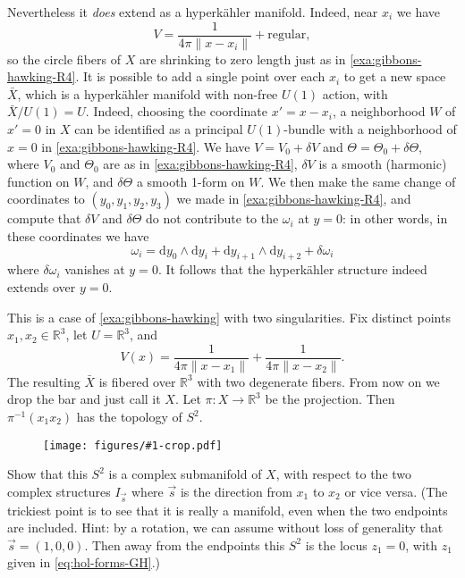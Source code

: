 \documentclass[12pt,letterpaper,reqno]{article}
\numberwithin{equation}{section}
\newcommand{\R}{\ensuremath{\mathbb R}}
\newcommand{\hk}{hyperk\"ahler\xspace}
\newcommand{\de}{\mathrm{d}}
\newcommand{\norm}[1]{\lVert#1\rVert}
\newcommand{\ti}[1]{\textit{#1}}
\newcommand{\insfig}[2]{\begin{figure}[htbp] \centering \texttt{[image: figures/\#1-crop.pdf]} \label{fig:#1} \end{figure}}
\begin{document}
\begin{example}
Nevertheless it \ti{does} extend as a \hk manifold.
Indeed, near $x_i$ we have
\begin{equation}
V = \frac{1}{4\pi\norm{x - x_i}} + \text{regular},
\end{equation}
so the circle fibers of $X$ are shrinking to zero
length just as in \autoref{exa:gibbons-hawking-R4}.
It is possible to add a single point over each $x_i$
to get a new space $\bar X$, which is a \hk manifold with non-free 
$U(1)$ action, with $\bar X / U(1) = U$.
Indeed, choosing the coordinate $x' = x - x_i$,
a neighborhood $W$ of $x' = 0$ in $X$ can be identified as a 
principal $U(1)$-bundle with a neighborhood of $x = 0$
in \autoref{exa:gibbons-hawking-R4}. We have
$V = V_0 + \delta V$ and $\Theta = \Theta_0 + \delta \Theta$,
where $V_0$ and $\Theta_0$ are as in \autoref{exa:gibbons-hawking-R4},
$\delta V$ is a smooth (harmonic) function on $W$, 
and $\delta \Theta$ a smooth 1-form on $W$.
We then make the same change of coordinates 
to $(y_0,y_1,y_2,y_3)$ we made in 
\autoref{exa:gibbons-hawking-R4}, and compute that $\delta V$
and $\delta \Theta$ do not contribute to the $\omega_i$ at
$y=0$: in other words, in these coordinates we have
\begin{equation} \label{eq:gibbons-hawking-near-singularity}
  \omega_i = \de y_0 \wedge \de y_i + \de y_{i+1} \wedge \de y_{i+2} + \delta \omega_i
\end{equation}
where $\delta \omega_i$ vanishes at $y = 0$. It follows
that the \hk structure indeed extends over $y = 0$.
\end{example}

\begin{example}
This is a case of \autoref{exa:gibbons-hawking}
with two singularities. Fix distinct points
$x_1, x_2 \in \R^3$, let $U = \R^3$, and 
\begin{equation}
  V(x) = \frac{1}{4\pi \norm{x - x_1}} + \frac{1}{4\pi \norm{x - x_2}}.
\end{equation}
The resulting $\bar X$ is fibered over $\R^3$ with two degenerate fibers.
From now on we drop the bar and just call it $X$.
Let $\pi: X \to \R^3$ be the projection.
Then $\pi^{-1}(x_1 x_2)$ has the topology of $S^2$.
\end{example}

\insfig{higgs-bundles-3}{0.8}

\begin{exercise}
Show that this $S^2$ is a complex submanifold of $X$, with
respect to the two complex structures $I_{\vec s}$ where $\vec s$
is the direction from $x_1$ to $x_2$ or vice versa.
(The trickiest point is to see that it is really a manifold,
even when the two endpoints are included. Hint: by a rotation,
we can assume without loss of generality that $\vec s = (1,0,0)$.
Then away from the endpoints this $S^2$ is the locus
$z_1 = 0$, with $z_1$ given in \eqref{eq:hol-forms-GH}.)
\end{exercise}
\end{document}
